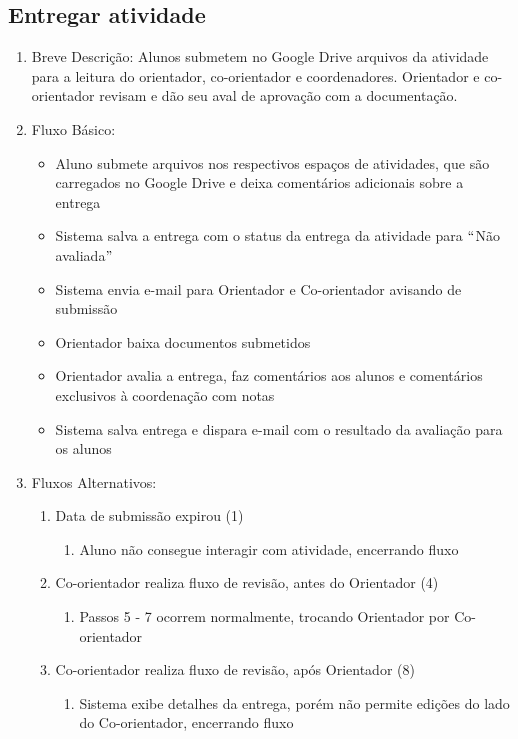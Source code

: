 \subsection{Entregar atividade}
\begin{enumerate}
    \item Breve Descrição: Alunos submetem no Google Drive arquivos da atividade para a leitura do orientador, co-orientador e coordenadores. Orientador e co-orientador revisam e dão seu aval de aprovação com a documentação.
    \item Fluxo Básico:
    \begin{itemize}
        \item Aluno submete arquivos nos respectivos espaços de atividades, que são carregados no Google Drive e deixa comentários adicionais sobre a entrega
        \item Sistema salva a entrega com o status da entrega da atividade para $``$Não avaliada$"$
        \item Sistema envia e-mail para Orientador e Co-orientador avisando de submissão
        \item Orientador baixa documentos submetidos
        \item Orientador avalia a entrega, faz comentários aos alunos e comentários exclusivos à coordenação com notas
        \item Sistema salva entrega e dispara e-mail com o resultado da avaliação para os alunos
    \end{itemize}
    \item Fluxos Alternativos:
    \begin{enumerate}
        \item Data de submissão expirou (1)
        \begin{enumerate}
            \item Aluno não consegue interagir com atividade, encerrando fluxo
        \end{enumerate}
        \item Co-orientador realiza fluxo de revisão, antes do Orientador (4)
        \begin{enumerate}
            \item Passos 5 - 7 ocorrem normalmente, trocando Orientador por Co-orientador
        \end{enumerate}
        \item Co-orientador realiza fluxo de revisão, após Orientador (8)
        \begin{enumerate}
            \item Sistema exibe detalhes da entrega, porém não permite edições do lado do Co-orientador, encerrando fluxo

\end{enumerate}
\end{enumerate}
\end{enumerate}
